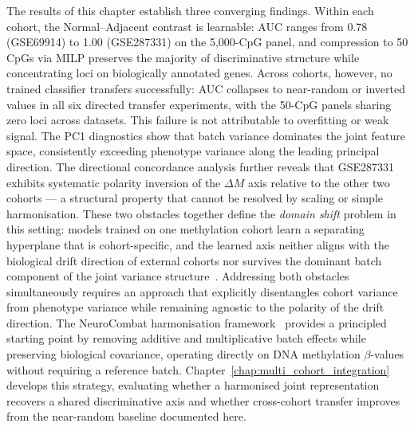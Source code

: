 The results of this chapter establish three converging
findings. Within each cohort, the Normal--Adjacent contrast
is learnable: AUC ranges from 0.78 (GSE69914) to 1.00
(GSE287331) on the 5,000-CpG panel, and compression to 50
CpGs via MILP preserves the majority of discriminative
structure while concentrating loci on biologically annotated
genes. Across cohorts, however, no trained classifier
transfers successfully: AUC collapses to near-random or
inverted values in all six directed transfer experiments,
with the 50-CpG panels sharing zero loci across datasets.
This failure is not attributable to overfitting or weak
signal. The PC1 diagnostics show that batch variance
dominates the joint feature space, consistently exceeding
phenotype variance along the leading principal direction.
The directional concordance analysis further reveals that
GSE287331 exhibits systematic polarity inversion of the
$\Delta M$ axis relative to the other two cohorts --- a
structural property that cannot be resolved by scaling or
simple harmonisation. These two obstacles together define
the \emph{domain shift} problem in this setting: models
trained on one methylation cohort learn a separating
hyperplane that is cohort-specific, and the learned axis
neither aligns with the biological drift direction of
external cohorts nor survives the dominant batch component
of the joint variance structure~\cite{Sokolov2024}.
Addressing both obstacles simultaneously requires an
approach that explicitly disentangles cohort variance from
phenotype variance while remaining agnostic to the polarity
of the drift direction. The NeuroCombat harmonisation
framework~\cite{fortin2018neurocombat} provides a principled
starting point by removing additive and multiplicative batch
effects while preserving biological covariance, operating
directly on DNA methylation $\beta$-values without requiring
a reference batch. Chapter~\ref{chap:multi_cohort_integration}
develops this strategy, evaluating whether a harmonised
joint representation recovers a shared discriminative axis
and whether cross-cohort transfer improves from the
near-random baseline documented here.
